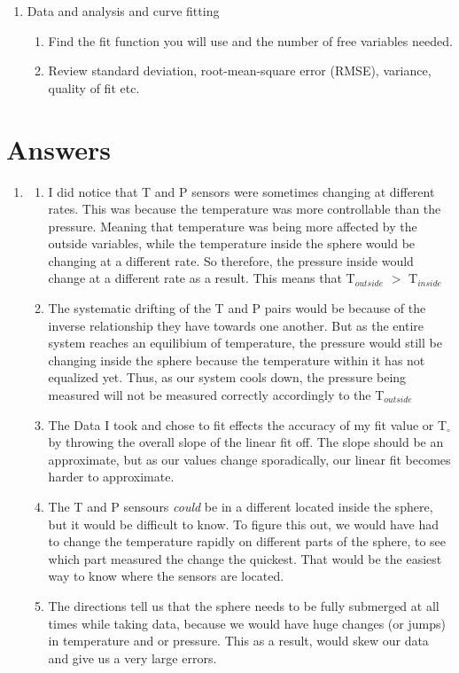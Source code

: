 \documentclass[12pt]{report}
\begin{document}
\begin{enumerate}
	\item Data and analysis and curve fitting
	\begin{enumerate}
		\item Find the fit function you will use and the number of free variables needed.
		\item Review standard deviation, root-mean-square error (RMSE), variance, quality of fit etc.
	\end{enumerate}

\end{enumerate}
\section{Answers}
	\begin{enumerate}
		\item 
		\begin{enumerate}
			\item I did notice that T and P sensors were sometimes changing at different rates. This was because the temperature was more controllable than the pressure. Meaning that temperature was being more affected by the outside variables, while the temperature inside the sphere would be changing at a different rate. So therefore, the pressure inside would change at a different rate as a result. This means that T$_{outside}$ $>$ T$_{inside}$
			\item The systematic drifting of the T and P pairs would be because of the inverse relationship they have towards one another. But as the entire system reaches an equilibium of temperature, the pressure would still be changing inside the sphere because the temperature within it has not equalized yet. Thus, as our system cools down, the pressure being measured will not be measured correctly accordingly to the T$_{outside}$
			\item The Data I took and chose to fit effects the accuracy of my fit value or T$_{\circ}$ by throwing the overall slope of the linear fit off. The slope should be an approximate, but as our values change sporadically, our linear fit becomes harder to approximate. 
			\item The T and P sensours \emph{could} be in a different located inside the sphere, but it would be difficult to know. To figure this out, we would have had to change the temperature rapidly on different parts of the sphere, to see which part measured the change the quickest. That would be the easiest way to know where the sensors are located. 
			\item The directions tell us that the sphere needs to be fully submerged at all times while taking data, because we would have huge changes (or jumps) in temperature and or pressure. This as a result, would skew our data and give us a very large errors.

\end{enumerate}
\end{enumerate}
\end{document}
